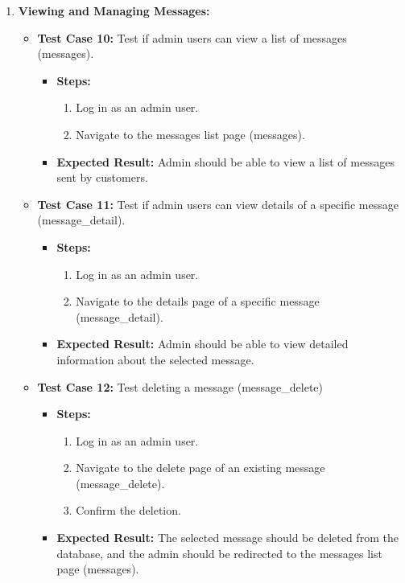 \begin{enumerate}
    \item \textbf{Viewing and Managing Messages:}
        \begin{itemize}
        \item \textbf{Test Case 10:} Test if admin users can view a list of messages (messages).
        \begin{itemize}
            \item \textbf{Steps:}
            \begin{enumerate}
                \item Log in as an admin user.
                \item Navigate to the messages list page (messages).
            \end{enumerate}
            \item \textbf{Expected Result:} Admin should be able to view a list of messages sent by customers.
        \end{itemize}
        \item \textbf{Test Case 11:} Test if admin users can view details of a specific message (message\_detail).
        \begin{itemize}
            \item \textbf{Steps:}
            \begin{enumerate}
                \item Log in as an admin user.
                \item Navigate to the details page of a specific message (message\_detail).
            \end{enumerate}
            \item \textbf{Expected Result:} Admin should be able to view detailed information about the selected message.
        \end{itemize}
        \item \textbf{Test Case 12:} Test deleting a message (message\_delete)
        \begin{itemize}
            \item \textbf{Steps:}
            \begin{enumerate}
                \item Log in as an admin user.
                \item Navigate to the delete page of an existing message (message\_delete).
                \item Confirm the deletion.
            \end{enumerate}
            \item \textbf{Expected Result:} The selected message should be deleted from the database, and the admin should be redirected to the messages list page (messages).

\end{itemize}
\end{itemize}
\end{enumerate}
